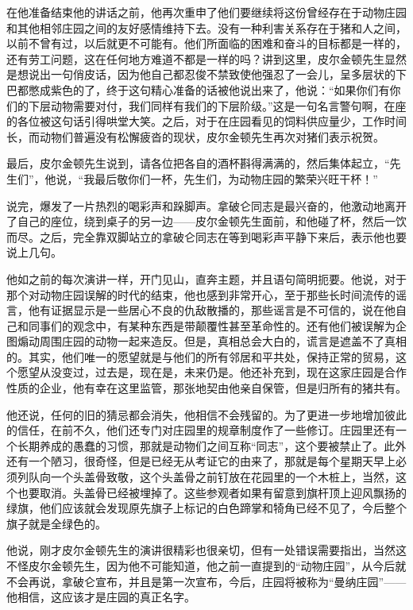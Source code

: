 在他准备结束他的讲话之前，他再次重申了他们要继续将这份曾经存在于动物庄园和其他相邻庄园之间的友好感情维持下去。没有一种利害关系存在于猪和人之间，以前不曾有过，以后就更不可能有。他们所面临的困难和奋斗的目标都是一样的，还有劳工问题，这在任何地方难道不都是一样的吗？讲到这里，皮尔金顿先生显然是想说出一句俏皮话，因为他自己都忍俊不禁致使他强忍了一会儿，呈多层状的下巴都憋成紫色的了，终于这句精心准备的话被他说出来了，他说：“如果你们有你们的下层动物需要对付，我们同样有我们的下层阶级。”这是一句名言警句啊，在座的各位被这句话引得哄堂大笑。之后，对于在庄园看见的饲料供应量少，工作时间长，而动物们普遍没有松懈疲沓的现状，皮尔金顿先生再次对猪们表示祝贺。

最后，皮尔金顿先生说到，请各位把各自的酒杯斟得满满的，然后集体起立，“先生们”，他说，“我最后敬你们一杯，先生们，为动物庄园的繁荣兴旺干杯！”

说完，爆发了一片热烈的喝彩声和跺脚声。拿破仑同志是最兴奋的，他激动地离开了自己的座位，绕到桌子的另一边——皮尔金顿先生面前，和他碰了杯，然后一饮而尽。之后，完全靠双脚站立的拿破仑同志在等到喝彩声平静下来后，表示他也要说上几句。

他如之前的每次演讲一样，开门见山，直奔主题，并且语句简明扼要。他说，对于那个对动物庄园误解的时代的结束，他也感到非常开心，至于那些长时间流传的谣言，他有证据显示是一些居心不良的仇敌散播的，那些谣言是不可信的，说在他自己和同事们的观念中，有某种东西是带颠覆性甚至革命性的。还有他们被误解为企图煽动周围庄园的动物一起来造反。但是，真相总会大白的，谎言是遮盖不了真相的。其实，他们唯一的愿望就是与他们的所有邻居和平共处，保持正常的贸易，这个愿望从没变过，过去是，现在是，未来仍是。他还补充到，现在这家庄园是合作性质的企业，他有幸在这里监管，那张地契由他亲自保管，但是归所有的猪共有。

他还说，任何的旧的猜忌都会消失，他相信不会残留的。为了更进一步地增加彼此的信任，在前不久，他们还专门对庄园里的规章制度作了一些修订。庄园里还有一个长期养成的愚蠢的习惯，那就是动物们之间互称“同志”，这个要被禁止了。此外还有一个陋习，很奇怪，但是已经无从考证它的由来了，那就是每个星期天早上必须列队向一个头盖骨致敬，这个头盖骨之前钉放在花园里的一个木桩上，当然，这个也要取消。头盖骨已经被埋掉了。这些参观者如果有留意到旗杆顶上迎风飘扬的绿旗，他们应该就会发现原先旗子上标记的白色蹄掌和犄角已经不见了，今后整个旗子就是全绿色的。

他说，刚才皮尔金顿先生的演讲很精彩也很亲切，但有一处错误需要指出，当然这不怪皮尔金顿先生，因为他不可能知道，他之前一直提到的“动物庄园”，从今后就不会再说，拿破仑宣布，并且是第一次宣布，今后，庄园将被称为“曼纳庄园”——他相信，这应该才是庄园的真正名字。


